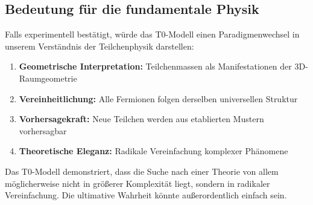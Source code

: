 	\subsection{Bedeutung für die fundamentale Physik}
	\label{subsec:bedeutung_physik}
	
	Falls experimentell bestätigt, würde das T0-Modell einen Paradigmenwechsel in unserem Verständnis der Teilchenphysik darstellen:
	
	\begin{enumerate}
		\item \textbf{Geometrische Interpretation:} Teilchenmassen als Manifestationen der 3D-Raumgeometrie
		\item \textbf{Vereinheitlichung:} Alle Fermionen folgen derselben universellen Struktur
		\item \textbf{Vorhersagekraft:} Neue Teilchen werden aus etablierten Mustern vorhersagbar
		\item \textbf{Theoretische Eleganz:} Radikale Vereinfachung komplexer Phänomene
	\end{enumerate}
	
	Das T0-Modell demonstriert, dass die Suche nach einer Theorie von allem möglicherweise nicht in größerer Komplexität liegt, sondern in radikaler Vereinfachung. Die ultimative Wahrheit könnte außerordentlich einfach sein.
	
